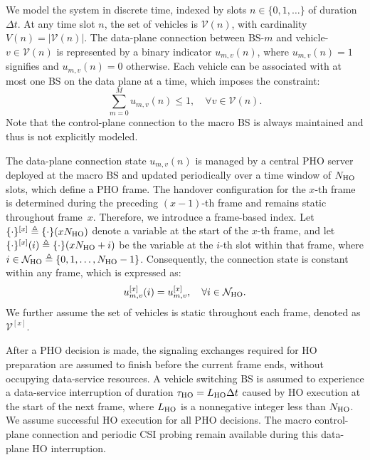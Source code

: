 \documentclass[10pt,journal,letterpaper]{journal_template/IEEEtran}
\newcommand{\rev}[1]{\textcolor{revisioncolor}{{}#1}}
\newif\ifshowdeletions
\newcommand{\currentdel}[1]{\ifshowdeletions\textcolor{deletioncolor}{\sout{#1}}\fi}
\theoremstyle{remark}
\begin{document}
We model the system in discrete time, indexed by slots $n \in \{0, 1, \dots\}$ of duration $\Delta t$. At any time slot $n$, the set of vehicles is $\mathcal{V}(n)$, with cardinality $V(n) = |\mathcal{V}(n)|$. The {data-plane}
connection between BS-$m$ and vehicle-$v \in \mathcal{V}(n)$ is represented by a binary indicator $u_{m,v}(n)$, where $u_{m,v}(n)=1$ signifies \currentdel{an active data-plane connection} and $u_{m,v}(n)=0$ otherwise. Each vehicle can be associated with at most one BS on the data plane at a time, which imposes the constraint:
\begin{equation}
    \sum_{m=0}^{M} u_{m,v}(n) \leq 1, \quad \forall v \in \mathcal{V}(n).
    \label{eq:connection_cons}
\end{equation}
Note that the control-plane connection to the macro BS is always maintained and thus is not explicitly modeled.

The data-plane connection state $u_{m,v}(n)$ is managed by a central PHO server deployed at the macro BS and updated periodically over a time window of $N_{\rm HO}$ slots, which define a PHO frame. The handover configuration for the $x$-th frame is determined during the preceding $(x-1)$-th frame and remains static throughout frame~$x$. Therefore, we introduce a frame-based index. Let $\{\cdot\}^{[x]} \triangleq \{\cdot\}(xN_{\rm HO})$ denote a variable at the start of the $x$-th frame, and let $\{\cdot\}^{[x]}(i) \triangleq \{\cdot\}(xN_{\rm HO} + i)$ be the variable at the $i$-th slot within that frame, where $i \in \mathcal{N}_{\rm HO} \triangleq \{0,1,\dots,N_{\rm HO}-1\}$. Consequently, the connection state is constant within any frame, which is expressed as:
    \begin{equation}
        u_{m,v}^{[x]}(i) = u_{m,v}^{[x]}, \quad \forall i \in \mathcal{N}_{\rm HO}.
        \label{eq:PHO_cons}
    \end{equation}
We further assume the set of vehicles is static throughout each frame, denoted as $\mathcal{V}^{[x]}$.

\rev{After a PHO decision is made, the signaling exchanges required for HO preparation are assumed to finish before the current frame ends, without occupying data-service resources. A vehicle switching BS is assumed to experience a data-service interruption of duration $\tau_{\rm HO}=L_{\rm HO}\Delta t$ caused by HO execution at the start of the next frame, where $L_{\rm HO}$ is a nonnegative integer less than $N_{\rm HO}$. We assume successful HO execution for all PHO decisions. The macro control-plane connection and periodic CSI probing remain available during this data-plane HO interruption.}
\end{document}
